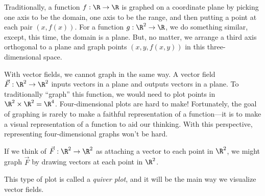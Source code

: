 Traditionally, a function $f:\R\to\R$ is graphed on a coordinate
plane by picking one axis to be the domain, one
axis to be the range, and then putting a point at each pair $(x,f(x))$.
For a function $g:\R^2\to\R$, we do something similar, except, this time,
the domain is a plane.  But, no matter, we arrange a third axis orthogonal
to a plane and graph points $(x,y,f(x,y))$ in this three-dimensional space.

With vector fields, we cannot graph in the same way.  A vector field
$\vec F:\R^2\to\R^2$ inputs vectors in a plane and outputs vectors in
a plane. To traditionally ``graph'' this function, we would need to
plot points in $\R^2\times\R^2=\R^4$.  Four-dimensional plots are hard to make!
Fortunately, the goal of graphing is rarely to make a faithful representation
of a function---it is to make a visual representation of a function
to aid our thinking.  With this perspective, representing four-dimensional
graphs won't be hard.

If we think of $\vec F:\R^2\to\R^2$ as attaching a vector to each point in
$\R^2$, we might graph $\vec F$ by drawing vectors at each point in $\R^2$.

\begin{center}
\end{center}

This type of plot is called a \emph{quiver plot},
and it will be the main way we visualize vector fields.

